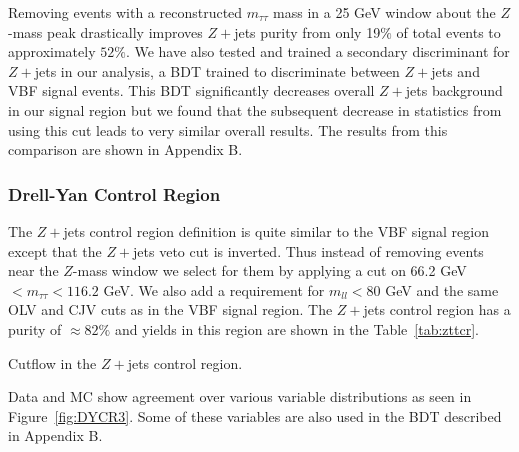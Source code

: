 Removing events with a reconstructed $m_{\tau\tau}$ mass in a 25 GeV window about the $Z$-mass peak drastically improves $Z+$jets purity from only 19$\%$ of total events to approximately $52\%$. We have also tested and trained a secondary discriminant for $Z+$jets in our analysis, a BDT trained to discriminate between $Z+$jets and VBF signal events. This BDT significantly decreases overall $Z+$jets background in our signal region but we found that the subsequent decrease in statistics from using this cut leads to very similar overall results. The results from this comparison are shown in Appendix B. 

\subsubsection{Drell-Yan Control Region}

The $Z+$jets control region definition is quite similar to the VBF signal region except that the $Z+$jets veto cut is inverted. Thus instead of removing events near the $Z$-mass window we select for them by applying a cut on 66.2 GeV $< m_{\tau\tau}< 116.2$ GeV. We also add a requirement for $m_{ll}<80$ GeV and the same OLV and CJV cuts as in the VBF signal region. The $Z+$jets control region has a purity of $\approx 82\%$ and yields in this region are shown in the Table~\ref{tab:zttcr}.

\begin{table}[h!]
\centering
\resizebox{\textwidth}{!}{
}
\caption{Cutflow in the $Z+$jets control region.}
\label{tab:zttcr}
\end{table}

Data and MC show agreement over various variable distributions as seen in Figure~\ref{fig:DYCR3}. Some of these variables are also used in the BDT described in Appendix B. 


